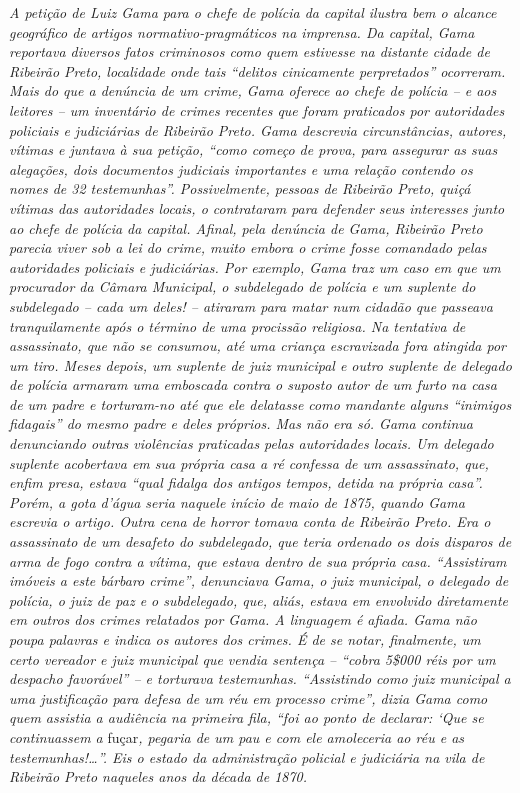 \begin{didascalia}
\emph{A petição de Luiz Gama para o chefe de polícia da capital ilustra
bem o alcance geográfico de artigos normativo-pragmáticos na imprensa.
Da capital, Gama reportava diversos fatos criminosos como quem estivesse
na distante cidade de Ribeirão Preto, localidade onde tais ``delitos
cinicamente perpretados'' ocorreram. Mais do que a denúncia de um crime,
Gama oferece ao chefe de polícia -- e aos leitores -- um inventário de
crimes recentes que foram praticados por autoridades policiais e
judiciárias de Ribeirão Preto. Gama descrevia circunstâncias, autores,
vítimas e juntava à sua petição, ``como começo de prova, para assegurar
as suas alegações, dois documentos judiciais importantes e uma relação
contendo os nomes de 32 testemunhas''. Possivelmente, pessoas de Ribeirão
Preto, quiçá vítimas das autoridades locais, o contrataram para defender
seus interesses junto ao chefe de polícia da capital. Afinal, pela
denúncia de Gama, Ribeirão Preto parecia viver sob a lei do crime, muito
embora o crime fosse comandado pelas autoridades policiais e
judiciárias. Por exemplo, Gama traz um caso em que um procurador da
Câmara Municipal, o subdelegado de polícia e um suplente do subdelegado
-- cada um deles! -- atiraram para matar num cidadão que passeava
tranquilamente após o término de uma procissão religiosa. Na tentativa
de assassinato, que não se consumou, até uma criança escravizada fora
atingida por um tiro. Meses depois, um suplente de juiz municipal e
outro suplente de delegado de polícia armaram uma emboscada contra o
suposto autor de um furto na casa de um padre e torturam-no até que ele
delatasse como mandante alguns ``inimigos fidagais'' do mesmo padre e
deles próprios. Mas não era só. Gama continua denunciando outras
violências praticadas pelas autoridades locais. Um delegado suplente
acobertava em sua própria casa a ré confessa de um assassinato, que,
enfim presa, estava ``qual fidalga dos antigos tempos, detida na própria
casa''. Porém, a gota d'água seria naquele início de maio de 1875, quando
Gama escrevia o artigo. Outra cena de horror tomava conta de Ribeirão
Preto. Era o assassinato de um desafeto do subdelegado, que teria
ordenado os dois disparos de arma de fogo contra a vítima, que estava
dentro de sua própria casa. ``Assistiram imóveis a este bárbaro crime'',
denunciava Gama, o juiz municipal, o delegado de polícia, o juiz de paz
e o subdelegado, que, aliás, estava em envolvido diretamente em outros
dos crimes relatados por Gama. A linguagem é afiada. Gama não poupa
palavras e indica os autores dos crimes. É de se notar, finalmente, um
certo vereador e juiz municipal que vendia sentença -- ``cobra 5\$000
réis por um despacho favorável'' -- e torturava testemunhas. ``Assistindo
como juiz municipal a uma justificação para defesa de um réu em processo
crime'', dizia Gama como quem assistia a audiência na primeira fila, ``foi
ao ponto de declarar: `Que se continuassem a} fuçar\emph{, pegaria de um
pau e com ele amoleceria ao réu e as testemunhas!\ldots{}''. Eis o estado da
administração policial e judiciária na vila de Ribeirão Preto naqueles
anos da década de 1870.}
\end{didascalia}

